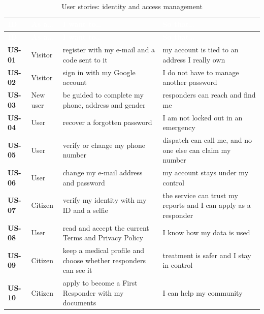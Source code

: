 {\tabfont\rowband
\begin{longtable}{@{}>{\raggedright\arraybackslash}p{}>{\raggedright\arraybackslash}p{}>{\raggedright\arraybackslash}p{}>{\raggedright\arraybackslash}p{}@{}}
\caption{User stories: identity and access management}\label{tab:us-iam}\\
\rowcolor{najdanavy}\textcolor{white}{\sffamily\bfseries\small ID} & \textcolor{white}{\sffamily\bfseries\small As a\ldots{}} & \textcolor{white}{\sffamily\bfseries\small I want to\ldots{}} & \textcolor{white}{\sffamily\bfseries\small So that\ldots{}}\\
\endfirsthead
\rowcolor{najdanavy}\textcolor{white}{\sffamily\bfseries\small ID} & \textcolor{white}{\sffamily\bfseries\small As a\ldots{}} & \textcolor{white}{\sffamily\bfseries\small I want to\ldots{}} & \textcolor{white}{\sffamily\bfseries\small So that\ldots{}}\\
\endhead
\bottomrule\endlastfoot
\textbf{US-01} & Visitor & register with my e-mail and a code sent to it & my account is tied to an address I really own\\
\textbf{US-02} & Visitor & sign in with my Google account & I do not have to manage another password\\
\textbf{US-03} & New user & be guided to complete my phone, address and gender & responders can reach and find me\\
\textbf{US-04} & User & recover a forgotten password & I am not locked out in an emergency\\
\textbf{US-05} & User & verify or change my phone number & dispatch can call me, and no one else can claim my number\\
\textbf{US-06} & User & change my e-mail address and password & my account stays under my control\\
\textbf{US-07} & Citizen & verify my identity with my ID and a selfie & the service can trust my reports and I can apply as a responder\\
\textbf{US-08} & User & read and accept the current Terms and Privacy Policy & I know how my data is used\\
\textbf{US-09} & Citizen & keep a medical profile and choose whether responders can see it & treatment is safer and I stay in control\\
\textbf{US-10} & Citizen & apply to become a First Responder with my documents & I can help my community\\

\end{longtable}}
